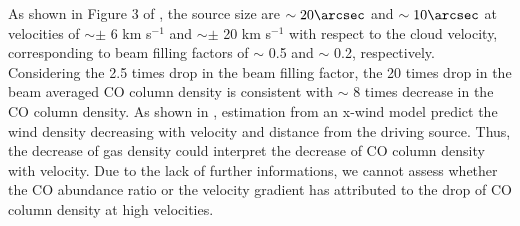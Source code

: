 As shown in Figure 3 of \citet{2009ApJ...696...66Q}, the source size are $\sim 20\arcsec$ and $\sim 10\arcsec$ at velocities of $\sim \pm$ 6 km s$^{-1}$ and $\sim \pm$ 20 km s$^{-1}$ with respect to the cloud velocity, corresponding to beam filling factors of $\sim$ 0.5 and $\sim$ 0.2, respectively. Considering the 2.5 times drop in the beam filling factor, the 20 times drop in the beam averaged CO column density is consistent with $\sim$ 8 times decrease in the CO column density. As shown in \citet{1995ApJ...455L.155S}, estimation from an x-wind model predict the wind density decreasing with velocity and distance from the driving source. Thus, the decrease of gas density could interpret the decrease of CO column density with velocity. Due to the lack of further informations, we cannot assess whether the CO abundance ratio or the velocity gradient has attributed to the drop of CO column density at high velocities.